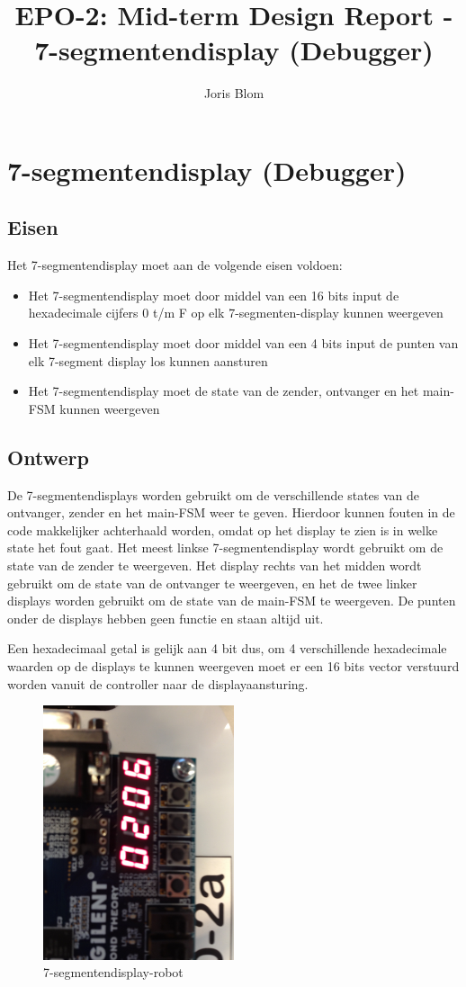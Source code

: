 \documentclass{report}
\title{EPO-2: Mid-term Design Report - 7-segmentendisplay (Debugger)}
\author{Joris Blom}
\begin{document}
\chapter{7-segmentendisplay (Debugger)}
\label{ch:segg}
\section{Eisen}
\label{sec:Eisen}
Het 7-segmentendisplay moet aan de volgende eisen voldoen: 
\begin{itemize}
\item Het 7-segmentendisplay moet door middel van een 16 bits input de hexadecimale cijfers 0 t/m F op elk 7-segmenten-display kunnen weergeven
\item Het 7-segmentendisplay moet door middel van een 4 bits input de punten van elk 7-segment display los kunnen aansturen
\item Het 7-segmentendisplay moet de state van de zender, ontvanger en het main-FSM kunnen weergeven
\end{itemize}

\section{Ontwerp}
De 7-segmentendisplays worden gebruikt om de verschillende states van de ontvanger, zender en het main-FSM weer te geven. Hierdoor kunnen fouten in de code makkelijker achterhaald worden, omdat op het display te zien is in welke state het fout gaat.
Het meest linkse 7-segmentendisplay wordt gebruikt om de state van de zender te weergeven.
Het display rechts van het midden wordt gebruikt om de state van de ontvanger te weergeven, en het de twee linker displays worden gebruikt om de state van de main-FSM te weergeven.
De punten onder de displays hebben geen functie en staan altijd uit.

Een hexadecimaal getal is gelijk aan 4 bit dus, om 4 verschillende hexadecimale waarden op de displays te kunnen weergeven moet er een 16 bits vector verstuurd worden vanuit de controller naar de displayaansturing.

\begin{figure}[H]
\centering
\includegraphics[width=0.5\textwidth]{7_segment_display-robot.jpg}

\caption{7-segmentendisplay-robot}
\end{figure}
\end{document}

